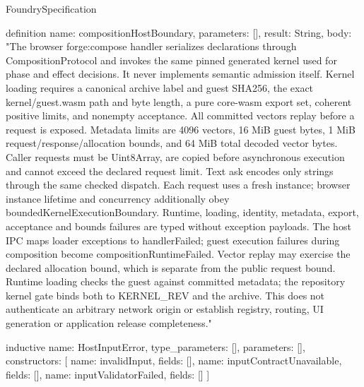 \begin{lexlean}{FoundrySpecification}
\begin{semanticmodule}
definition{
  name: compositionHostBoundary,
  parameters: [],
  result: String,
  body: "The browser forge:compose handler serializes declarations through CompositionProtocol and invokes the same pinned generated kernel used for phase and effect decisions. It never implements semantic admission itself. Kernel loading requires a canonical archive label and guest SHA256, the exact kernel/guest.wasm path and byte length, a pure core-wasm export set, coherent positive limits, and nonempty acceptance. All committed vectors replay before a request is exposed. Metadata limits are 4096 vectors, 16 MiB guest bytes, 1 MiB request/response/allocation bounds, and 64 MiB total decoded vector bytes. Caller requests must be Uint8Array, are copied before asynchronous execution and cannot exceed the declared request limit. Text ask encodes only strings through the same checked dispatch. Each request uses a fresh instance; browser instance lifetime and concurrency additionally obey boundedKernelExecutionBoundary. Runtime, loading, identity, metadata, export, acceptance and bounds failures are typed without exception payloads. The host IPC maps loader exceptions to handlerFailed; guest execution failures during composition become compositionRuntimeFailed. Vector replay may exercise the declared allocation bound, which is separate from the public request bound. Runtime loading checks the guest against committed metadata; the repository kernel gate binds both to KERNEL_REV and the archive. This does not authenticate an arbitrary network origin or establish registry, routing, UI generation or application release completeness."
}

inductive{
  name: HostInputError,
  type_parameters: [],
  parameters: [],
  constructors: [
    {name: invalidInput, fields: []},
    {name: inputContractUnavailable, fields: []},
    {name: inputValidatorFailed, fields: []}
  ]
}


\end{semanticmodule}
\end{lexlean}
